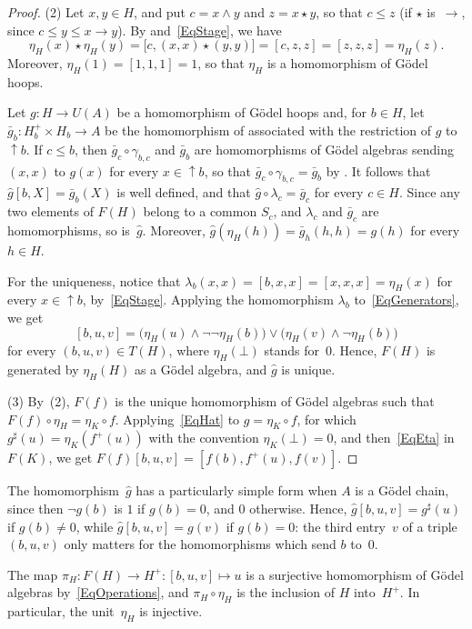 \documentclass[reqno,a4paper]{amsart}
\theoremstyle{plain}
\theoremstyle{definition}
\theoremstyle{remark}
\numberwithin{equation}{section}
\newcommand{\up}{{\uparrow}}
\begin{document}
\begin{proof}
(2) Let $x,y\in H$, and put $c=x\wedge y$ and $z=x\star y$, so that $c\leq z$ (if $\star$ is~$\to$, since $c\leq y\leq x\to y$). By  and~\eqref{EqStage}, we have
\[
\eta_H(x)\star\eta_H(y)=\bigl[c,(x,x)\star(y,y)\bigr]=[c,z,z]=[z,z,z]=\eta_H(z).
\]
Moreover, $\eta_H(1)=[1,1,1]=1$, so that $\eta_H$ is a homomorphism of G\"odel hoops.

Let $g\colon H\to U(A)$ be a homomorphism of G\"odel hoops and, for $b\in H$, let $\bar g_b\colon H_b^+\times H_b\to A$ be the homomorphism of  associated with the restriction of $g$ to~${\up}b$. If $c\leq b$, then $\bar g_c\circ\gamma_{b,c}$ and $\bar g_b$ are homomorphisms of G\"odel algebras sending $(x,x)$ to $g(x)$ for every $x\in{\up}b$, so that $\bar g_c\circ\gamma_{b,c}=\bar g_b$ by . It follows that $\hat g[b,X]=\bar g_b(X)$ is well defined, and that $\hat g\circ\lambda_c=\bar g_c$ for every $c\in H$. Since any two elements of $F(H)$ belong to a common $S_c$, and $\lambda_c$ and $\bar g_c$ are homomorphisms, so is~$\hat g$. Moreover, $\hat g(\eta_H(h))=\bar g_h(h,h)=g(h)$ for every $h\in H$.

For the uniqueness, notice that $\lambda_b(x,x)=[b,x,x]=[x,x,x]=\eta_H(x)$ for every $x\in{\up}b$, by~\eqref{EqStage}. Applying the homomorphism $\lambda_b$ to~\eqref{EqGenerators}, we get
\begin{equation}\label{EqEta}
[b,u,v]=\bigl(\eta_H(u)\wedge\neg\neg\eta_H(b)\bigr)\vee\bigl(\eta_H(v)\wedge\neg\eta_H(b)\bigr)
\end{equation}
for every $(b,u,v)\in T(H)$, where $\eta_H(\bot)$ stands for~$0$. Hence, $F(H)$ is generated by $\eta_H(H)$ as a G\"odel algebra, and $\hat g$ is unique.

(3) By~(2), $F(f)$ is the unique homomorphism of G\"odel algebras such that $F(f)\circ\eta_H=\eta_K\circ f$. Applying~\eqref{EqHat} to $g=\eta_K\circ f$, for which $g^\sharp(u)=\eta_K(f^+(u))$ with the convention $\eta_K(\bot)=0$, and then~\eqref{EqEta} in~$F(K)$, we get $F(f)[b,u,v]=[f(b),f^+(u),f(v)]$.
\end{proof}

The homomorphism~$\hat g$ has a particularly simple form when $A$ is a G\"odel chain, since then $\neg g(b)$ is $1$ if $g(b)=0$, and $0$ otherwise. Hence, $\hat g[b,u,v]=g^\sharp(u)$ if $g(b)\neq0$, while $\hat g[b,u,v]=g(v)$ if $g(b)=0$: the third entry~$v$ of a triple $(b,u,v)$ only matters for the homomorphisms which send $b$ to~$0$.

The map $\pi_H\colon F(H)\to H^+\colon[b,u,v]\mapsto u$ is a surjective homomorphism of G\"odel algebras by~\eqref{EqOperations}, and $\pi_H\circ\eta_H$ is the inclusion of $H$ into~$H^+$. In particular, the unit~$\eta_H$ is injective.
\end{document}

